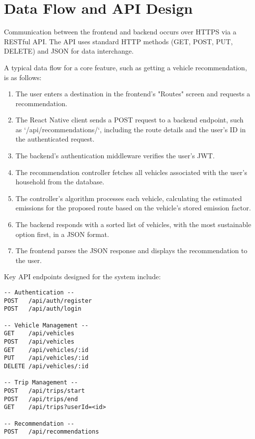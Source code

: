 
\section{Data Flow and API Design}
Communication between the frontend and backend occurs over HTTPS via a RESTful API. The API uses standard HTTP methods (GET, POST, PUT, DELETE) and JSON for data interchange.

A typical data flow for a core feature, such as getting a vehicle recommendation, is as follows:
\begin{enumerate}
    \item The user enters a destination in the frontend's "Routes" screen and requests a recommendation.
    \item The React Native client sends a POST request to a backend endpoint, such as `/api/recommendations/`, including the route details and the user's ID in the authenticated request.
    \item The backend's authentication middleware verifies the user's JWT.
    \item The recommendation controller fetches all vehicles associated with the user's household from the database.
    \item The controller's algorithm processes each vehicle, calculating the estimated emissions for the proposed route based on the vehicle's stored emission factor.
    \item The backend responds with a sorted list of vehicles, with the most sustainable option first, in a JSON format.
    \item The frontend parses the JSON response and displays the recommendation to the user.
\end{enumerate}

Key API endpoints designed for the system include:
\begin{verbatim}
-- Authentication --
POST   /api/auth/register
POST   /api/auth/login

-- Vehicle Management --
GET    /api/vehicles
POST   /api/vehicles
GET    /api/vehicles/:id
PUT    /api/vehicles/:id
DELETE /api/vehicles/:id

-- Trip Management --
POST   /api/trips/start
POST   /api/trips/end
GET    /api/trips?userId=<id>

-- Recommendation --
POST   /api/recommendations
\end{verbatim}

